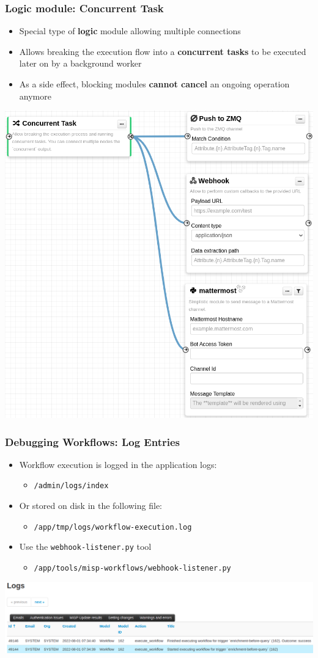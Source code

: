 \begin{frame}
    \frametitle{Logic module: Concurrent Task}
    \begin{itemize}
        \item Special type of \textbf{logic} module allowing multiple connections
        \item Allows breaking the execution flow into a \textbf{concurrent tasks} to be executed later on by a background worker
        \item As a side effect, blocking modules \textbf{cannot cancel} an ongoing operation anymore
    \end{itemize}
    \begin{center}
        \includegraphics[width=0.45\linewidth]{pictures/module-concurrent.png}
    \end{center}
\end{frame}

\begin{frame}
    \frametitle{Debugging Workflows: Log Entries}
    \begin{itemize}
        \item Workflow execution is logged in the application logs:
        \begin{itemize}
            \item \texttt{/admin/logs/index}
        \end{itemize}
        \item Or stored on disk in the following file:
        \begin{itemize}
            \item \texttt{/app/tmp/logs/workflow-execution.log}
        \end{itemize}
        \item Use the \texttt{webhook-listener.py} tool
        \begin{itemize}
            \item \texttt{/app/tools/misp-workflows/webhook-listener.py}
        \end{itemize}
    \end{itemize}
    \begin{center}
        \includegraphics[width=1.0\linewidth]{pictures/workflow-debug.png}
    \end{center}
\end{frame}

